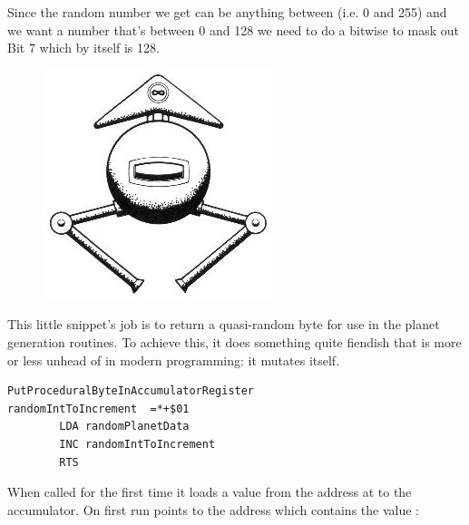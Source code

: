 Since the random number we get can be anything between  (i.e. 0 and 255) and we want a number
that's between 0 and 128 we need to do a bitwise  to mask out Bit 7 which by itself is 128.
\clearpage
\begin{definition}
\setlength{\intextsep}{0pt}%
\setlength{\columnsep}{3pt}%
\begin{figure}
\includegraphics[width=\linewidth]{src/callout/ia.jpg} 
\end{figure}
\small

This little snippet's job is to return a quasi-random byte for use in the planet generation
routines. To achieve this, it does something quite fiendish that is more or less unhead of in modern
programming: it mutates itself.

\begin{lstlisting}[caption=Neat.,escapechar=\%]
PutProceduralByteInAccumulatorRegister
randomIntToIncrement  =*+$01
        LDA randomPlanetData
        INC randomIntToIncrement
        RTS
\end{lstlisting}

When called for the first time it loads a value from the address at  to the accumulator. On first
run  points to the address  which contains the value :


\end{definition}
